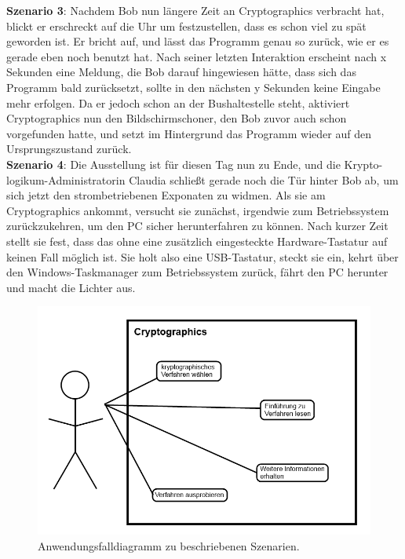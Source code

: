 \documentclass{article}
\begin{document}
\textbf{Szenario 3}:
Nachdem Bob nun längere Zeit an \gls{Cryptographics} verbracht hat, blickt er erschreckt auf die Uhr um festzustellen, dass es schon viel zu spät geworden ist. Er bricht auf, und lässt das Programm genau so zurück, wie er es gerade eben noch benutzt hat. Nach seiner letzten Interaktion erscheint nach x Sekunden eine Meldung, die Bob darauf hingewiesen hätte, dass sich das Programm bald zurücksetzt, sollte in den nächsten y Sekunden keine Eingabe mehr erfolgen. Da er jedoch schon an der Bushaltestelle steht, aktiviert \gls{Cryptographics} nun den Bildschirmschoner, den Bob zuvor auch schon vorgefunden hatte, und setzt im Hintergrund das Programm wieder auf den Ursprungszustand zurück.\\

\textbf{Szenario 4}:
Die Ausstellung ist für diesen Tag nun zu Ende, und die Krypto-logikum-Administratorin Claudia schließt gerade noch die Tür hinter Bob ab, um sich jetzt den strombetriebenen Exponaten zu widmen. Als sie am \gls{Cryptographics} ankommt, versucht sie zunächst, irgendwie zum Betriebssystem zurückzukehren, um den PC sicher herunterfahren zu können. Nach kurzer Zeit stellt sie fest, dass das ohne eine zusätzlich eingesteckte Hardware-Tastatur auf keinen Fall möglich ist. Sie holt also eine USB-Tastatur, steckt sie ein, kehrt über den Windows-Taskmanager zum Betriebssystem zurück, fährt den PC herunter und macht die Lichter aus.\\

\begin{figure}[h!]
  \centering
    \includegraphics[width=\textwidth]{resources/usecase1}
  \caption{Anwendungsfalldiagramm zu beschriebenen Szenarien.}
\end{figure}
\end{document}
